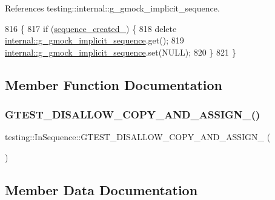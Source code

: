 References testing\+::internal\+::g\+\_\+gmock\+\_\+implicit\+\_\+sequence.


\begin{DoxyCode}
816                         \{
817   \textcolor{keywordflow}{if} (\hyperlink{classtesting_1_1InSequence_ae8a5805923f65001454a83f344f9292c}{sequence\_created\_}) \{
818     \textcolor{keyword}{delete} \hyperlink{namespacetesting_1_1internal_af4407fe8aeb1e43b2f58940736a20590}{internal::g\_gmock\_implicit\_sequence}.get();
819     \hyperlink{namespacetesting_1_1internal_af4407fe8aeb1e43b2f58940736a20590}{internal::g\_gmock\_implicit\_sequence}.set(NULL);
820   \}
821 \}
\end{DoxyCode}


\subsection{Member Function Documentation}
\mbox{\label{classtesting_1_1InSequence_a9c39af86c33e18340f50136eefd7b694}} 
\subsubsection{\texorpdfstring{G\+T\+E\+S\+T\+\_\+\+D\+I\+S\+A\+L\+L\+O\+W\+\_\+\+C\+O\+P\+Y\+\_\+\+A\+N\+D\+\_\+\+A\+S\+S\+I\+G\+N\+\_\+()}{GTEST\_DISALLOW\_COPY\_AND\_ASSIGN\_()}}
{\footnotesize\ttfamily testing\+::\+In\+Sequence\+::\+G\+T\+E\+S\+T\+\_\+\+D\+I\+S\+A\+L\+L\+O\+W\+\_\+\+C\+O\+P\+Y\+\_\+\+A\+N\+D\+\_\+\+A\+S\+S\+I\+G\+N\+\_\+ (\begin{DoxyParamCaption}\item[{\hyperlink{classtesting_1_1InSequence}{In\+Sequence}}]{ }\end{DoxyParamCaption})\hspace{0.3cm}{\ttfamily [private]}}



\subsection{Member Data Documentation}
\mbox{\label{classtesting_1_1InSequence_ae8a5805923f65001454a83f344f9292c}} 
